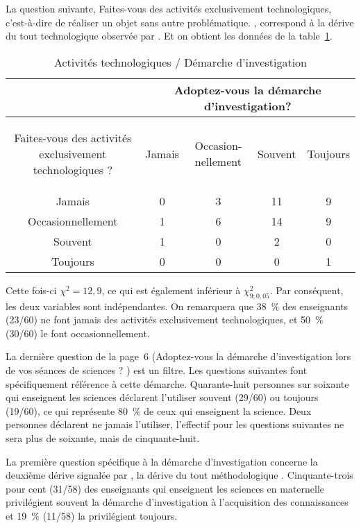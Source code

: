 La question suivante, \og Faites-vous des activités exclusivement technologiques, c’est-à-dire de réaliser un objet sans autre problématique. \fg{}, correspond à la dérive du \og tout technologique \fg{} observée par . Et on obtient les données  de la table~\ref{technologiques}.
\begin{table}[h!btp]
\centering
\caption{\label{technologiques} Activités technologiques / Démarche d’investigation}
	\begin{tabular}{|c|c|c|c|c|}
	\cline{2-5}
	\multicolumn{1}{c|}{} & \multicolumn{4}{c|}{Adoptez-vous la démarche d’investigation?} \\ 
	\hline 
	\begin{minipage}[l]{3.7cm}\begin{flushleft}Faites-vous des activités exclusivement technologiques ?\end{flushleft}\end{minipage} & Jamais & \begin{minipage}[c]{2cm}Occasion- nellement\end{minipage} & Souvent & Toujours \\ 
	\hline 
	Jamais & 0 & 3 & 11 & 9 \\ 
	\hline 
	Occasionnellement & 1 & 6 & 14 & 9 \\ 
	\hline 
	Souvent & 1 & 0 & 2 & 0 \\ 
	\hline 
	Toujours & 0 & 0 & 0 & 1 \\ 
	\hline 
	\end{tabular}
\end{table}
Cette fois-ci $\chi^2=12,9$, ce qui est également inférieur à $\chi^2_{9;0,05}$. Par conséquent, les deux variables sont indépendantes. On remarquera que 38~\% des enseignants (23/60) ne font jamais des activités exclusivement technologiques, et 50~\% (30/60) le font occasionnellement.

La dernière question de la page~6 (\og Adoptez-vous la démarche d’investigation lors de vos séances de sciences ? \fg{} ) est un filtre. Les questions suivantes font spécifiquement référence à cette démarche. Quarante-huit personnes sur  soixante qui enseignent les sciences déclarent l’utiliser souvent (29/60) ou toujours (19/60), ce qui représente 80~\% de ceux qui enseignent la science. Deux personnes déclarent ne jamais l’utiliser, l’effectif pour les questions suivantes ne sera plus de soixante, mais de cinquante-huit.

La première question spécifique à la démarche d’investigation concerne la deuxième dérive signalée par , la dérive du \og tout méthodologique \fg{}. Cinquante-trois pour cent (31/58) des enseignants qui enseignent les sciences en maternelle privilégient souvent la démarche d’investigation à l’acquisition des connaissances et 19~\% (11/58) la privilégient toujours.

